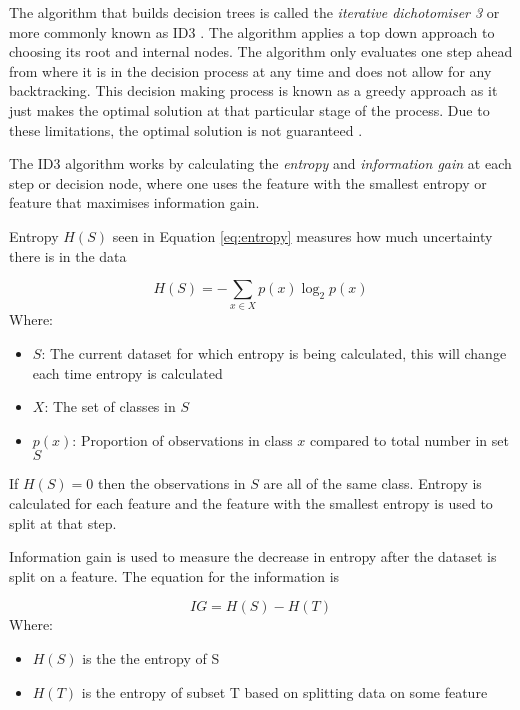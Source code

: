 The algorithm that builds decision trees is called the \textit{iterative dichotomiser 3} or more commonly known as ID3 \citep{quinlan_induction_1986}. The algorithm applies a top down approach to choosing its root and internal nodes. The algorithm only evaluates one step ahead from where it is in the decision process at any time and does not allow for any backtracking. This decision making process is known as a greedy approach as it just makes the optimal solution at that particular stage of the process. Due to these limitations, the optimal solution is not guaranteed \citep{friedman_lazy_1996}.

The ID3 algorithm works by calculating the \textit{entropy} and \textit{information gain} at each step or decision node, where one uses the feature with the smallest entropy or feature that maximises information gain.

Entropy $H(S)$ seen in Equation \ref{eq:entropy} measures how much uncertainty there is in the data \citep{shannon_mathematical_2001}

\begin{equation} \label{eq:entropy}
	H(S) = - \sum_{x \in X} p(x) \log_{2} p(x)
\end{equation}
Where:
\begin{itemize}[label=]
	\item $S$: The current dataset for which entropy is being calculated, this will change each time entropy is calculated
	\item $X$: The set of classes in $S$
	\item $p(x)$: Proportion of observations in class $x$ compared to total number in set $S$
\end{itemize}
If $H(S) = 0$ then the observations in $S$ are all of the same class. Entropy is calculated for each feature and the feature with the smallest entropy is used to split at that step.

Information gain is used to measure the decrease in entropy after the dataset is split on a feature. The equation for the information is 

\begin{equation} \label{eq:infoGain}
	IG = H(S) -  H(T)
\end{equation}
Where:
\begin{itemize}[label=]
	\item $H(S)$ is the the entropy of S
	\item $H(T)$ is the entropy of subset T based on splitting data on some feature
\end{itemize}

